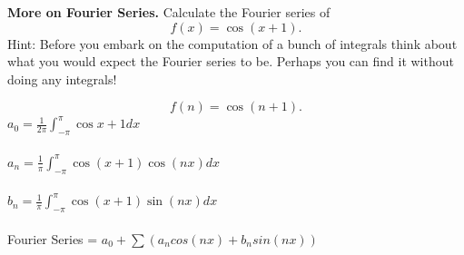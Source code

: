 \textbf{More on Fourier Series.} Calculate the Fourier series
of \[f(x) = \cos(x + 1).\] Hint: Before you embark on the computation
of a bunch of integrals think about what you would expect the Fourier
series to be. Perhaps you can find it without doing any integrals!


{\color{blue}
 \[f(n) = \cos(n + 1).\]
\centering
$a_{0}=\frac{1}{2\pi}\int_{-\pi}^{\pi}\cos x+1 dx$ ~\\  ~\\
$a_{n}=\frac{1}{\pi}\int_{-\pi}^{\pi}\cos (x+1)\cos(nx)dx$ ~\\ ~\\
$b_{n}=\frac{1}{\pi}\int_{-\pi}^{\pi}\cos (x+1)\sin(nx)dx$ ~\\ ~\\
Fourier Series  =  $a_{0}+\sum (a_{n}cos(nx)+b_{n}sin(nx))$

}
